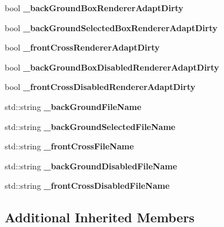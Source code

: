 \begin{DoxyCompactItemize}
bool {\bfseries \+\_\+back\+Ground\+Box\+Renderer\+Adapt\+Dirty}
\item 
\mbox{\label{classui_1_1AbstractCheckButton_acc14d0bea2db2a4c90c714a7e2b36e13}} 
bool {\bfseries \+\_\+back\+Ground\+Selected\+Box\+Renderer\+Adapt\+Dirty}
\item 
\mbox{\label{classui_1_1AbstractCheckButton_adb82ddeccebc76feda667b4bfd6c0f7f}} 
bool {\bfseries \+\_\+front\+Cross\+Renderer\+Adapt\+Dirty}
\item 
\mbox{\label{classui_1_1AbstractCheckButton_a33c4edda51f228797c3d6acb0a7e0ed9}} 
bool {\bfseries \+\_\+back\+Ground\+Box\+Disabled\+Renderer\+Adapt\+Dirty}
\item 
\mbox{\label{classui_1_1AbstractCheckButton_ab58f9cbb47f56e05895ab53de52c62a3}} 
bool {\bfseries \+\_\+front\+Cross\+Disabled\+Renderer\+Adapt\+Dirty}
\item 
\mbox{\label{classui_1_1AbstractCheckButton_a975e44c5a1dde6c9a287dac22077f7b3}} 
std\+::string {\bfseries \+\_\+back\+Ground\+File\+Name}
\item 
\mbox{\label{classui_1_1AbstractCheckButton_a4b9de78c2c0da8661b517c08f9c5a9d9}} 
std\+::string {\bfseries \+\_\+back\+Ground\+Selected\+File\+Name}
\item 
\mbox{\label{classui_1_1AbstractCheckButton_a0167e23543a4787a90406a83e706af63}} 
std\+::string {\bfseries \+\_\+front\+Cross\+File\+Name}
\item 
\mbox{\label{classui_1_1AbstractCheckButton_a44f1175a0d8b72a6ef65927a87d96f7e}} 
std\+::string {\bfseries \+\_\+back\+Ground\+Disabled\+File\+Name}
\item 
\mbox{\label{classui_1_1AbstractCheckButton_a29dd08f73564d2ea4462e3b9e30cb214}} 
std\+::string {\bfseries \+\_\+front\+Cross\+Disabled\+File\+Name}
\end{DoxyCompactItemize}
\subsection*{Additional Inherited Members}


